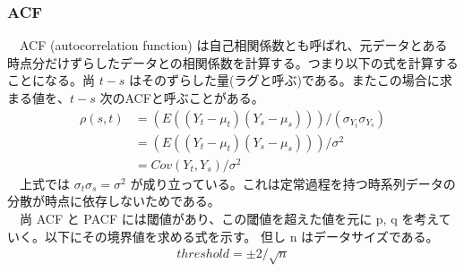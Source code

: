 \documentclass{scrartcl}
\begin{document}
\subsubsection{ACF}
\label{sec:org3c64e03}
　ACF (autocorrelation function) は自己相関係数とも呼ばれ、元データとある時点分だけずらしたデータとの相関係数を計算する。つまり以下の式を計算することになる。尚 \(t-s\) はそのずらした量(ラグと呼ぶ)である。またこの場合に求まる値を、\(t-s\) 次のACFと呼ぶことがある。\\
\begin{align}
\rho(s,t) &= (E((Y_t - \mu_t)(Y_s-\mu_s)))/(\sigma_{Y_t}\sigma_{Y_s}) \nonumber \\
&= (E((Y_t - \mu_t)(Y_s-\mu_s)))/\sigma^2 \nonumber \\
&= Cov(Y_t, Y_s)/\sigma^2
\end{align}
　上式では \(\sigma_t\sigma_s = \sigma^2\) が成り立っている。これは定常過程を持つ時系列データの分散が時点に依存しないためである。\\
　尚 ACF と PACF には閾値があり、この閾値を超えた値を元に p, q を考えていく。以下にその境界値を求める式を示す。 但し n はデータサイズである。\\
\begin{align}
threshold = \pm 2/\sqrt{n}
\end{align}
\end{document}
